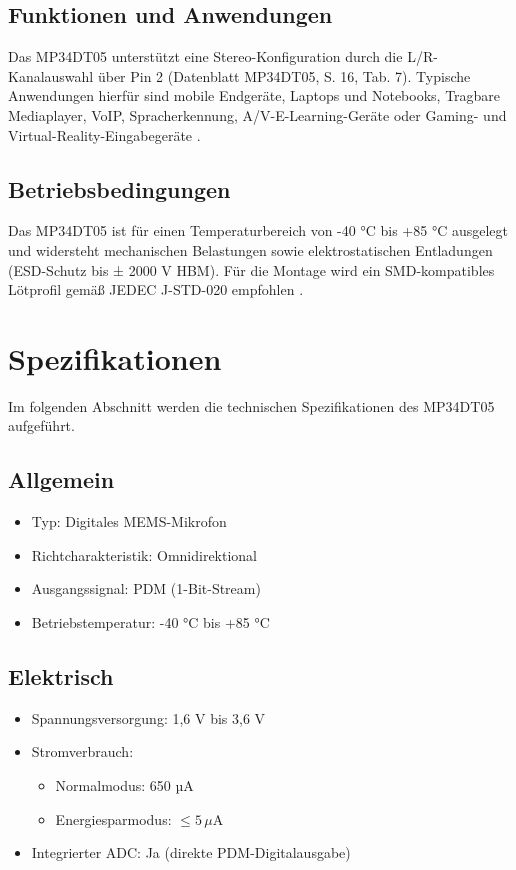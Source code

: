 \bigskip

\subsection{Funktionen und Anwendungen}
Das MP34DT05 unterstützt eine Stereo-Konfiguration durch die L/R- Kanalauswahl über Pin 2 (Datenblatt MP34DT05, S. 16, Tab. 7). Typische Anwendungen hierfür sind mobile Endgeräte, Laptops und Notebooks, Tragbare Mediaplayer, VoIP, Spracherkennung, A/V-E-Learning-Geräte oder Gaming- und Virtual-Reality-Eingabegeräte \cite{STMicroelectronics:2021b}.

\bigskip

\subsection{Betriebsbedingungen}
Das MP34DT05 ist für einen Temperaturbereich von -40 °C bis +85 °C ausgelegt und widersteht mechanischen Belastungen sowie elektrostatischen Entladungen (ESD-Schutz bis ± 2000 V HBM). Für die Montage wird ein SMD-kompatibles Lötprofil gemäß JEDEC J-STD-020 empfohlen \cite{STMicroelectronics:2021b}.


\section{Spezifikationen}

Im folgenden Abschnitt werden die technischen Spezifikationen des MP34DT05 aufgeführt.

\bigskip

\subsection{Allgemein}
\begin{itemize}
	\item Typ: Digitales MEMS-Mikrofon
	\item Richtcharakteristik: Omnidirektional
	\item Ausgangssignal: PDM (1-Bit-Stream)
	\item Betriebstemperatur: -40 °C bis +85 °C
\end{itemize}

\bigskip

\subsection{Elektrisch}
\begin{itemize}
	\item Spannungsversorgung: 1,6 V bis 3,6 V
	\item Stromverbrauch:
	\begin{itemize}
		\item Normalmodus: 650 µA
		\item Energiesparmodus: $\leq 5\,\mu\text{A}$
	\end{itemize}
	\item Integrierter ADC: Ja (direkte PDM-Digitalausgabe)
\end{itemize}


